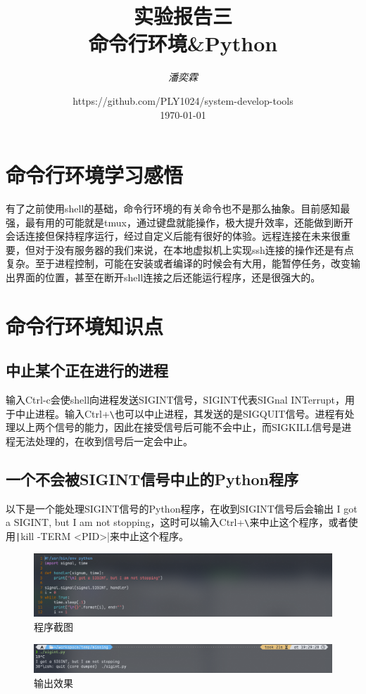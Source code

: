 \documentclass[fontset=ubuntu]{ctexart}
\title{\Huge \textbf{实验报告三 \\ 命令行环境\&Python}}
\author{\textit{潘奕霖}}
\date{https://github.com/PLY1024/system-develop-tools\\ \today}
\begin{document}
\maketitle
\newpage

\tableofcontents
\newpage

\section{命令行环境学习感悟}
有了之前使用shell的基础，命令行环境的有关命令也不是那么抽象。目前感知最强，最有用的可能就是tmux，通过键盘就能操作，极大提升效率，还能做到断开会话连接但保持程序运行，经过自定义后能有很好的体验。远程连接在未来很重要，但对于没有服务器的我们来说，在本地虚拟机上实现ssh连接的操作还是有点复杂。至于进程控制，可能在安装或者编译的时候会有大用，能暂停任务，改变输出界面的位置，甚至在断开shell连接之后还能运行程序，还是很强大的。

\section{命令行环境知识点}
\subsection{中止某个正在进行的进程}
输入Ctrl-c会使shell向进程发送SIGINT信号，SIGINT代表SIGnal INTerrupt，用于中止进程。输入Ctrl+\verb|\|也可以中止进程，其发送的是SIGQUIT信号。进程有处理以上两个信号的能力，因此在接受信号后可能不会中止，而SIGKILL信号是进程无法处理的，在收到信号后一定会中止。

\subsection{一个不会被SIGINT信号中止的Python程序}
以下是一个能处理SIGINT信号的Python程序，在收到SIGINT信号后会输出
I got a SIGINT, but I am not stopping，这时可以输入Ctrl+\verb|\|来中止这个程序，或者使用\texttt|kill -TERM <PID>|来中止这个程序。
\begin{figure}[htb]
    \centering
    \includegraphics[width=0.75\linewidth]{Sigint_1.png}
    \caption{程序截图}
    \label{fig:Sigint_1}
\end{figure}

\begin{figure}[htb]
    \centering
    \includegraphics[width=0.75\linewidth]{Ctrl_1.png}
    \caption{输出效果}
    \label{fig:Ctrl_1}
\end{figure}
\end{document}

